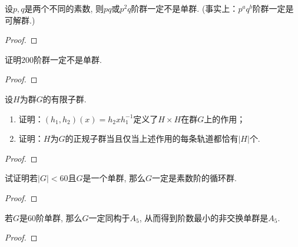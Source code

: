 \begin{problem}
    设$p, q$是两个不同的素数, 则$pq$或$p^2q$阶群一定不是单群.
(事实上：$p^aq^b$阶群一定是可解群.)
\end{problem}

\begin{proof}
    
\end{proof}

\begin{problem}
    证明$200$阶群一定不是单群.
\end{problem}

\begin{proof}
    
\end{proof}

\begin{problem}
    设$H$为群$G$的有限子群.
\begin{enumerate}[(1)]
    \item 证明：$(h_1, h_2)(x) = h_2xh_1^{-1}$定义了$H \times H$在群$G$上的作用；
    \item 证明：$H$为$G$的正规子群当且仅当上述作用的每条轨道都恰有$|H|$个.
\end{enumerate}
\end{problem}

\begin{proof}
    
\end{proof}

\begin{problem}
    试证明若$|G| < 60$且$G$是一个单群, 那么$G$一定是素数阶的循环群.
\end{problem}

\begin{proof}
    
\end{proof}

\begin{problem}
    若$G$是$60$阶单群, 那么$G$一定同构于$A_5$,
从而得到阶数最小的非交换单群是$A_5$.
\end{problem}

\begin{proof}
    
\end{proof}